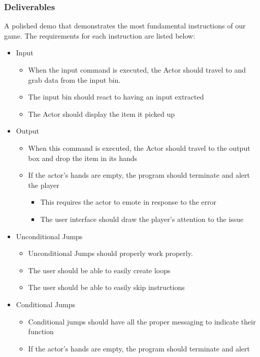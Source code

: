 \subsubsection*{Deliverables}
A polished demo that demonstrates the most fundamental instructions of our game.
The requirements for each instruction are listed below:

\begin{itemize}
  \item Input
  \begin{itemize}
    \item When the input command is executed, the Actor should travel to and
    grab data from the input bin.
    \item The input bin should react to having an input extracted
    \item The Actor should display the item it picked up
  \end{itemize}
  \item Output
  \begin{itemize}
    \item When this command is executed, the Actor should travel to the output box
    and drop the item in its hands
    \item If the actor’s hands are empty, the program should terminate and alert
    the player
    \begin{itemize}
      \item This requires the actor to emote in response to the error
      \item The user interface should draw the player’s attention to the issue
    \end{itemize}
  \end{itemize}
  \item Unconditional Jumps
  \begin{itemize}
    \item Unconditional Jumps should properly work properly.
    \item The user should be able to easily create loops
    \item The user should be able to easily skip instructions
  \end{itemize}
  \item Conditional Jumps
  \begin{itemize}
    \item Conditional jumps should have all the proper messaging to indicate
    their function
    \item If the actor’s hands are empty, the program should terminate and alert

\end{itemize}
\end{itemize}
